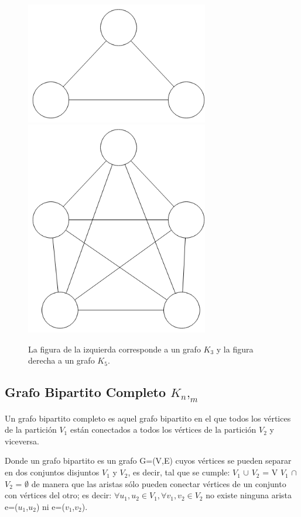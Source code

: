\begin{figure}[H]
\includegraphics[width=80mm]{K3.png}
\includegraphics[width=80mm]{K5.png}
\caption{La figura de la izquierda corresponde a un grafo $K_3$ y la figura derecha a un grafo $K_5$.}
\label{overflow}
\end{figure}

\subsection{Grafo Bipartito Completo $K_n$$,_m$}
Un grafo bipartito completo es aquel grafo bipartito en el que todos los vértices de la partición $V_1$ están conectados a todos los vértices de la partición $V_2$ y viceversa.

Donde un grafo bipartito es un grafo G=(V,E) cuyos vértices se pueden separar en dos conjuntos disjuntos $V_1$ y $V_2$, es decir, tal que se cumple:
$V_1$ $\cup$ $V_2$ = V
$V_1$ $\cap$ $V_2$ = $\emptyset$
de manera que las aristas sólo pueden conectar vértices de un conjunto con vértices del otro; es decir:
$\forall u_1, u_2 \in V_1, \forall v_1, v_2 \in V_2$ no existe ninguna arista e=($u_1$,$u_2$) ni e=($v_1$,$v_2$).

